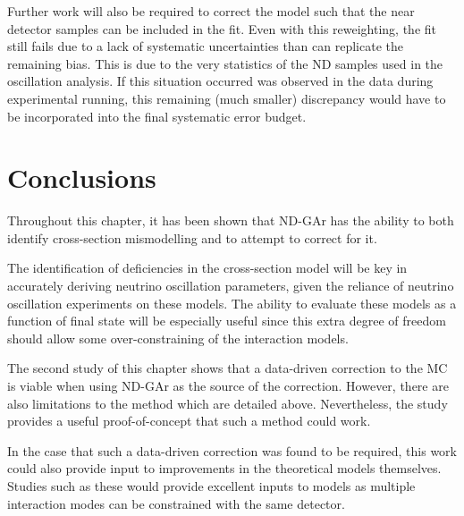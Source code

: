 Further work will also be required to correct the model such that the near detector samples can be included in the fit.
Even with this reweighting, the fit still fails due to a lack of systematic uncertainties than can replicate the remaining bias.
This is due to the very statistics of the ND samples used in the oscillation analysis.
If this situation occurred was observed in the data during experimental running, this remaining (much smaller) discrepancy would have to be incorporated into the final systematic error budget.

\section{Conclusions}
\label{sec:dune_ndrwt:conclusions}

Throughout this chapter, it has been shown that ND-GAr has the ability to both identify cross-section mismodelling and to attempt to correct for it.

The identification of deficiencies in the cross-section model will be key in accurately deriving neutrino oscillation parameters, given the reliance of neutrino oscillation experiments on these models.
The ability to evaluate these models as a function of final state will be especially useful since this extra degree of freedom should allow some over-constraining of the interaction models.

The second study of this chapter shows that a data-driven correction to the MC is viable when using ND-GAr as the source of the correction.
However, there are also limitations to the method which are detailed above. 
Nevertheless, the study provides a useful proof-of-concept that such a method could work.

In the case that such a data-driven correction was found to be required, this work could also provide input to improvements in the theoretical models themselves.
Studies such as these would provide excellent inputs to models as multiple interaction modes can be constrained with the same detector.